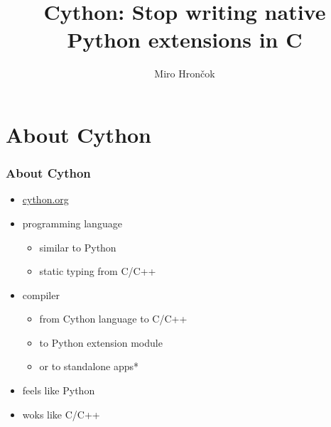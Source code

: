 \documentclass{beamer}
\title{Cython: Stop writing native Python extensions in C}
\author{Miro Hrončok}
\institute[RedHat]{\pic{Logo_RH_PMS_Default}}
\begin{document}
\begin{frame}
  \titlepage
\end{frame}



%

\section{About Cython}

\begin{frame}
  \frametitle{About Cython}
    \begin{itemize}
      \item \href{http://cython.org/}{cython.org}
      \item programming language
        \begin{itemize}
          \item similar to Python
          \item static typing from C/C++
        \end{itemize}
      \item compiler
        \begin{itemize}
          \item from Cython language to C/C++
          \item to Python extension module
          \item or to standalone apps*
        \end{itemize}
      \item feels like Python
      \item woks like C/C++
    \end{itemize}
\end{frame}
\end{document}
